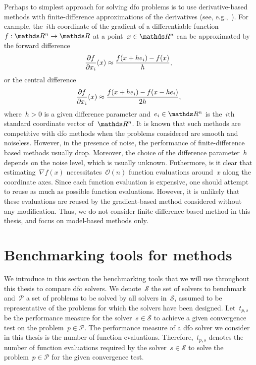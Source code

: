 Perhaps to simplest approach for solving \gls{dfo} problems is to use derivative-based methods with finite-difference approximations of the derivatives (see, e.g.,~\cite{Shi_Etal_2021}).
For example, the~$i$th coordinate of the gradient of a differentiable function~$\obj : \R^n \to \R$ at a point~$x \in \R^n$ can be approximated by the forward difference
\begin{equation*}
    \frac{\partial f}{\partial x_i}(x) \approx \frac{f(x + h e_i) - f(x)}{h},
\end{equation*}
or the central difference
\begin{equation*}
    \frac{\partial f}{\partial x_i}(x) \approx \frac{f(x + h e_i) - f(x - h e_i)}{2h},
\end{equation*}
where~$h > 0$ is a given difference parameter and~$e_i \in \R^n$ is the~$i$th standard coordinate vector of~$\R^n$.
It is known that such methods are competitive with \gls{dfo} methods when the problems considered are smooth and noiseless.
However, in the presence of noise, the performance of finite-difference based methods usually drop.
Moreover, the choice of the difference parameter~$h$ depends on the noise level, which is usually unknown.
Futhermore, is it clear that estimating~$\nabla f(x)$ necessitates~$\mathcal{O}(n)$ function evaluations around~$x$ along the coordinate axes.
Since each function evaluation is expensive, one should attempt to reuse as much as possible function evaluations.
However, it is unlikely that these evaluations are reused by the gradient-based method considered without any modification.
Thus, we do not consider finite-difference based method in this thesis, and focus on model-based methods only.


\section{Benchmarking tools for  methods}

We introduce in this section the benchmarking tools that we will use throughout this thesis to compare \gls{dfo} solvers.
We denote~$\mathcal{S}$ the set of solvers to benchmark and~$\mathcal{P}$ a set of problems to be solved by all solvers in~$\mathcal{S}$, assumed to be representative of the problems for which the solvers have been designed.
Let~$t_{p, s}$ be the performance measure for the solver~$s \in \mathcal{S}$ to achieve a given convergence test on the problem~$p \in \mathcal{P}$.
The performance measure of a \gls{dfo} solver we consider in this thesis is the number of function evaluations.
Therefore,~$t_{p, s}$ denotes the number of function evaluations required by the solver~$s \in \mathcal{S}$ to solve the problem~$p \in \mathcal{P}$ for the given convergence test.

